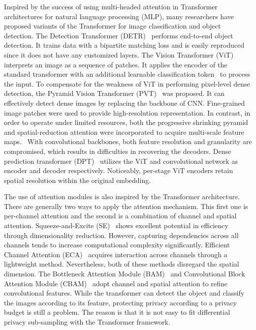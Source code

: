 \documentclass[journal,transmag]{IEEEtran}
\begin{document}
Inspired by the success of using multi-headed attention in Transformer architectures for natural language processing (MLP), many researchers have proposed variants of the Transformer for image classification and object detection.
The Detection Transformer (DETR)~\cite{carion2020end} performs end-to-end object detection. 
It trains data with a bipartite matching loss and is easily reproduced since it does not have any customized layers.
The Vision Transformer (ViT)~\cite{dosovitskiy2020image} interprets an image as a sequence of patches.
It applies the encoder of the standard transformer with an additional learnable classification token~\cite{vaswani2017attention} to process the input. 
To compensate for the weakness of ViT in performing pixel-level dense detection, the Pyramid Vision Transformer (PVT)~\cite{wang2021pyramid} was proposed. It can effectively detect dense images by replacing the backbone of CNN.
Fine-grained image patches were used to provide high-resolution representation. 
In contrast, in order to operate under limited resources, both the progressive shrinking pyramid and spatial-reduction attention were incorporated to acquire multi-scale feature maps. 
With convolutional backbones, both feature resolution and granularity are compromised, which results in difficulties in recovering the decoders. Dense prediction transformer (DPT)~\cite{ranftl2021vision} utilizes the ViT and convolutional network as encoder and decoder respectively. Noticeably, per-stage ViT encoders retain spatial resolution within the original embedding. 

The use of attention modules is also inspired by the Transformer architecture.
There are generally two ways to apply the attention mechanism.
This first one is per-channel attention and the second is a combination of channel and spatial attention. Squeeze-and-Excite (SE)~\cite{hu2018squeeze} shows excellent potential in efficiency through dimensionality reduction. However, capturing dependencies across all channels tends to increase computational complexity significantly. 
Efficient Channel Attention (ECA)~\cite{qilong2020eca} acquires interaction across channels through a lightweight method. Nevertheless, both of these methods disregard the spatial dimension. 
The Bottleneck Attention Module (BAM)~\cite{park2018bam} and Convolutional Block Attention Module (CBAM)~\cite{woo2018cbam} adopt channel and spatial attention to refine convolutional features. 
While the transformer can detect the object and classify the images according to its feature, protecting privacy according to a privacy budget is still a problem. The reason is that it is not easy to fit differential privacy sub-sampling with the Transformer framework.
\ifCLASSOPTIONcaptionsoff
  \newpage
\fi
\end{document}
